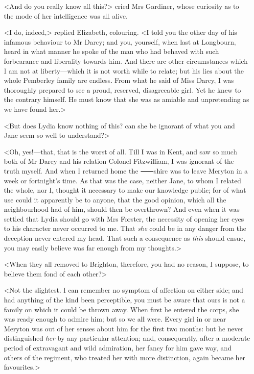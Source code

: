 <And do you really know all this?> cried Mrs Gardiner, whose curiosity as to the mode of her intelligence was all alive.

<I do, indeed,> replied Elizabeth, colouring. <I told you the other day of his infamous behaviour to Mr Darcy; and you, yourself, when last at Longbourn, heard in what manner he spoke of the man who had behaved with such forbearance and liberality towards him. And there are other circumstances which I am not at liberty—which it is not worth while to relate; but his lies about the whole Pemberley family are endless. From what he said of Miss Darcy, I was thoroughly prepared to see a proud, reserved, disagreeable girl. Yet he knew to the contrary himself. He must know that she was as amiable and unpretending as we have found her.>

<But does Lydia know nothing of this? can she be ignorant of what you and Jane seem so well to understand?>

<Oh, yes!—that, that is the worst of all. Till I was in Kent, and saw so much both of Mr Darcy and his relation Colonel Fitzwilliam, I was ignorant of the truth myself. And when I returned home the ⸺shire was to leave Meryton in a week or fortnight's time. As that was the case, neither Jane, to whom I related the whole, nor I, thought it necessary to make our knowledge public; for of what use could it apparently be to anyone, that the good opinion, which all the neighbourhood had of him, should then be overthrown? And even when it was settled that Lydia should go with Mrs Forster, the necessity of opening her eyes to his character never occurred to me. That \textit{she} could be in any danger from the deception never entered my head. That such a consequence as \textit{this} should ensue, you may easily believe was far enough from my thoughts.>

<When they all removed to Brighton, therefore, you had no reason, I suppose, to believe them fond of each other?>

<Not the slightest. I can remember no symptom of affection on either side; and had anything of the kind been perceptible, you must be aware that ours is not a family on which it could be thrown away. When first he entered the corps, she was ready enough to admire him; but so we all were. Every girl in or near Meryton was out of her senses about him for the first two months: but he never distinguished \textit{her} by any particular attention; and, consequently, after a moderate period of extravagant and wild admiration, her fancy for him gave way, and others of the regiment, who treated her with more distinction, again became her favourites.>


